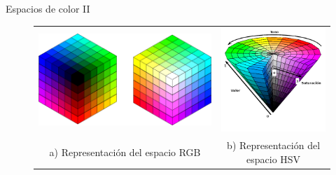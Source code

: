 \documentclass[11pt]{beamer}
\begin{document}
        \begin{frame}{Espacios de color II}
        
            \begin{figure}[h!]
                \centering
                \footnotesize
                \begin{tabular}{cc}
                    \includegraphics[height=0.27\textwidth,keepaspectratio]{imagenes/cubos_rgb.png} &
                    \includegraphics[height=0.27\textwidth,keepaspectratio]{imagenes/cono_hsv.png} \\
                    
                    a) Representación del espacio RGB & b) Representación del espacio HSV
                \end{tabular}
            \end{figure}
        

\end{frame}
\end{document}
